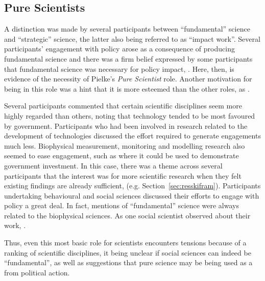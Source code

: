 \subsection{Pure Scientists}\label{sec:disscientist}
A distinction was made by several participants between ``fundamental'' science and ``strategic'' science, the latter also being referred to as ``impact work''. Several participants' engagement with policy arose as a consequence of producing fundamental science and there was a firm belief expressed by some participants that fundamental science was necessary for policy impact, . Here, then, is evidence of the necessity of Pielke's \emph{Pure Scientist} role. Another motivation for being in this role was a hint that it is more esteemed than the other roles, as . 

Several participants commented that certain scientific disciplines seem more highly regarded than others, noting that technology tended to be most favoured by government. Participants who had been involved in research related to the development of technologies discussed the effort required to generate engagements much less. Biophysical measurement, monitoring and modelling research also seemed to ease engagement, such as where it could be used to demonstrate government investment. In this case, there was a theme across several participants that the interest was for more scientific research when they felt existing findings are already sufficient,  (e.g. Section~\ref{sec:resskifram}). Participants undertaking behavioural and social sciences discussed their efforts to engage with policy a great deal. In fact, mentions of ``fundamental'' science were always related to the biophysical sciences. As one social scientist observed about their work, . 

Thus, even this most basic \SPI{} role for scientists encounters tensions because of a ranking of scientific disciplines, it being unclear if social sciences can indeed be ``fundamental'', as well as suggestions that pure science may be being used as a  from political action.

